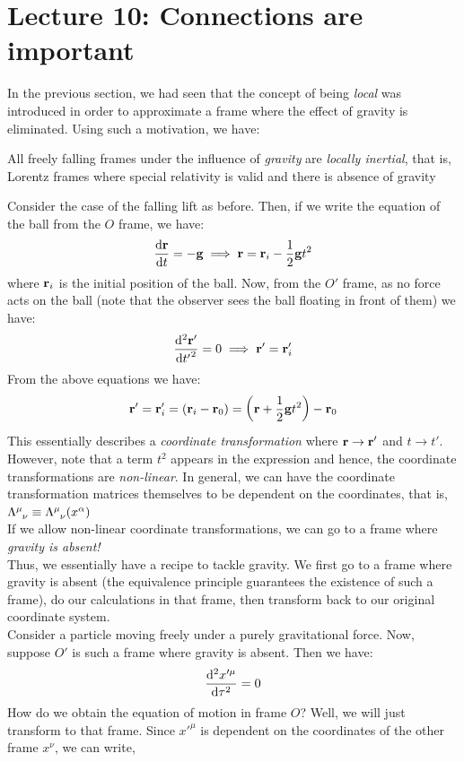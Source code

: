 \section*{Lecture 10: Connections are important}
In the previous section, we had seen that the concept of being \textit{local} was introduced in order to approximate a frame where the effect of gravity is eliminated. Using such a motivation, we have:
\begin{principle}
All freely falling frames under the influence of \textit{gravity} are \textit{locally inertial}, that is, Lorentz frames where special relativity is valid and there is absence of gravity
\end{principle}
Consider the case of the falling lift as before. Then, if we write the equation of the ball from the $O$ frame, we have:
$$\dv{\vb{r}}{t} = -\vb{g} \implies \vb{r} = \vb{r}_i - \frac{1}{2}\vb{g}t^2$$
where $\vb{r}_i$ is the initial position of the ball. Now, from the $O'$ frame, as no force acts on the ball (note that the observer sees the ball floating in front of them) we have:
$$\dv[2]{{\vb{r}'}}{{t'}} = 0\implies \vb{r}' = \vb{r}_i'$$
From the above equations we have:
$$\vb{r}' = \vb{r}_i'= (\vb{r}_i -\vb{r}_0) = \qty(\vb{r}+ \frac{1}{2}\vb{g}t^2) - \vb{r}_0 $$
This essentially describes a \textit{coordinate transformation} where $\vb{r}\rightarrow \vb{r}' $ and $t\rightarrow t'$. However, note that a term $t^2$ appears in the expression and hence, the coordinate transformations are \textit{non-linear}. In general, we can have the coordinate transformation matrices themselves to be dependent on the coordinates, that is, $\trmat{\mu}{\nu} \equiv \trmat{\mu}{\nu}(x^\alpha)$\\[0.2cm]
If we allow non-linear coordinate transformations, we can go to a frame where \textit{gravity is absent!}\\[0.2cm]
Thus, we essentially have a recipe to tackle gravity. We first go to a frame where gravity is absent (the equivalence principle guarantees the existence of such a frame), do our calculations in that frame, then transform back to our original coordinate system. \\[0.2cm]
Consider a particle moving freely under a purely gravitational force. Now, suppose $O'$ is such a frame where gravity is absent. Then we have:
$$\dv[2]{x'^\mu}{\tau}=0$$
How do we obtain the equation of motion in frame $O$? Well, we will just transform to that frame. Since $x'^\mu$ is dependent on the coordinates of the other frame $x^\nu$, we can write,
